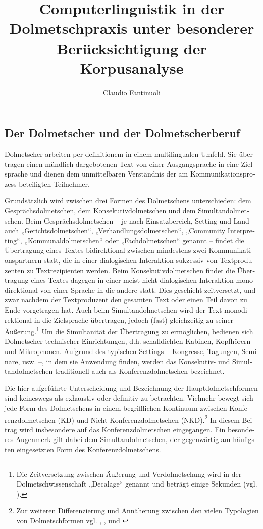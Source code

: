 \documentclass[output=paper]{LSP/langsci}
\author{Claudio Fantinuoli}
\title{Computerlinguistik in der Dolmetschpraxis unter besonderer Berücksichtigung der Korpusanalyse}
\begin{document}
\begin{otherlanguage}{ngerman}



\section{Der Dolmetscher und der Dolmetscherberuf}\label{sec:fantinuoli:1}

Dolmetscher arbeiten per definitionem in einem multilingualen Umfeld. Sie übertragen einen mündlich dargebotenen Text von einer Ausgangsprache in eine Zielsprache und dienen dem unmittelbaren Verständnis der am Kommunikationsprozess beteiligten Teilnehmer.

Grundsätzlich wird zwischen drei Formen des Dolmetschens unterschieden: dem Gesprächsdolmetschen, dem Konsekutivdolmetschen und dem Simultandolmetschen. Beim Gesprächsdolmetschen -- je nach Einsatzbereich, Setting und Land auch „Gerichtsdolmetschen“, „Verhandlungsdolmetschen“, „Community Interpreting“, „Kommunaldolmetschen“ oder „Fachdolmetschen“ genannt -- findet die Übertragung eines Textes bidirektional zwischen mindestens zwei Kommunikationspartnern statt, die in einer dialogischen Interaktion sukzessiv von Textproduzenten zu Textrezipienten werden. Beim Konsekutivdolmetschen findet die Übertragung eines Textes dagegen in einer meist nicht dialogischen Interaktion monodirektional von einer Sprache in die andere statt. Dies geschieht zeitversetzt, und zwar nachdem der Textproduzent den gesamten Text oder einen Teil davon zu Ende vorgetragen hat. Auch beim Simultandolmetschen wird der Text monodirektional in die Zielsprache übertragen, jedoch (fast) gleichzeitig zu seiner Äußerung.\footnote{Die Zeitversetzung zwischen Äußerung und Verdolmetschung wird in der Dolmetschwissenschaft „Decalage“ genannt und beträgt einige Sekunden (vgl. \citealt{Pöchhacker2004}).} Um die Simultanität der Übertragung zu ermöglichen, bedienen sich Dolmetscher technischer Einrichtungen, d.h. schalldichten Kabinen, Kopfhörern und Mikrophonen. Aufgrund des typischen Settings -- Kongresse, Tagungen, Seminare, usw. --, in dem sie Anwendung finden, werden das Konsekutiv- und Simultandolmetschen traditionell auch als Konferenzdolmetschen bezeichnet. 

Die hier aufgeführte Unterscheidung und Bezeichnung der Hauptdolmetschformen sind keineswegs als exhaustiv oder definitiv zu betrachten. Vielmehr bewegt sich jede Form des Dolmetschens in einem begrifflichen Kontinuum zwischen Konferenzdolmetschen (KD) und Nicht-Konferenzdolmetschen (NKD).\footnote{Zur weiteren Differenzierung und Annäherung zwischen den vielen Typologien von Dolmetschformen vgl. \citet[25ff]{Feldweg1996}, \citet[51]{Kalina2001}, \citet[33]{Pöchhacker2000} und \citet[354ff]{Gross-Dinter2009}} In diesem Beitrag wird insbesondere auf das Konferenzdolmetschen eingegangen. Ein besonderes Augenmerk gilt dabei dem Simultandolmetschen, der gegenwärtig am häufigsten eingesetzten Form des Konferenzdolmetschens.


\end{otherlanguage}
\end{document}
